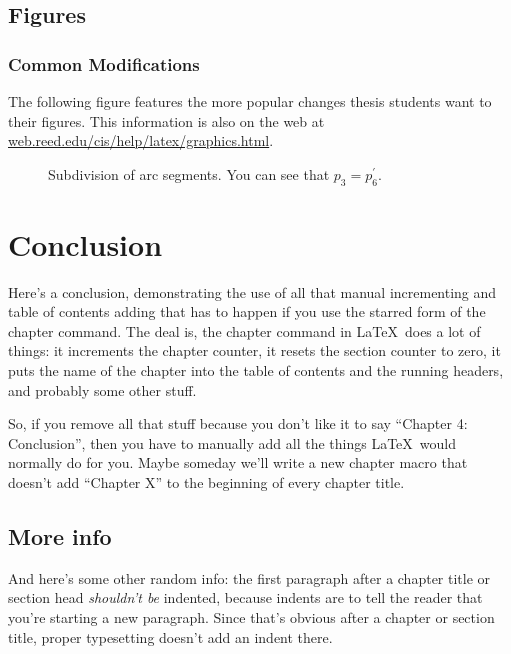 	\clearpage 
   
   \section{Figures}
   
	
      \subsection{Common Modifications}
      The following figure features the more popular changes thesis students want to their figures. This information is also on the web at \url{web.reed.edu/cis/help/latex/graphics.html}.
    \begin{figure}[htbp]
    \begin{center}
    \caption[Subdivision of arc segments]{\footnotesize{Subdivision of arc segments. You can see that $ p_3 = p_6^\prime$.}} %
    \label{barplot}
    \end{center}
    \end{figure} 

\chapter*{Conclusion}
	\setcounter{chapter}{4}
	\setcounter{section}{0}
	
Here's a conclusion, demonstrating the use of all that manual incrementing and table of contents adding that has to happen if you use the starred form of the chapter command. The deal is, the chapter command in \LaTeX\ does a lot of things: it increments the chapter counter, it resets the section counter to zero, it puts the name of the chapter into the table of contents and the running headers, and probably some other stuff. 

So, if you remove all that stuff because you don't like it to say ``Chapter 4: Conclusion'', then you have to manually add all the things \LaTeX\ would normally do for you. Maybe someday we'll write a new chapter macro that doesn't add ``Chapter X'' to the beginning of every chapter title.

\section{More info}
And here's some other random info: the first paragraph after a chapter title or section head \emph{shouldn't be} indented, because indents are to tell the reader that you're starting a new paragraph. Since that's obvious after a chapter or section title, proper typesetting doesn't add an indent there. 


